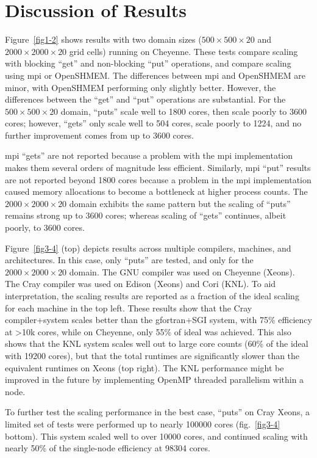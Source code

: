 \section{Discussion of Results}
Figure~\ref{fig1-2} shows results with two domain sizes ($500 \times 500 \times 20$ and $2000 \times 2000 \times 20$ grid cells) running on Cheyenne.
These tests compare scaling with blocking ``get'' and non-blocking ``put'' operations, and compare scaling using \gls{mpi} or OpenSHMEM.
The differences between \gls{mpi} and OpenSHMEM are minor, with OpenSHMEM performing only slightly better.
However, the differences between the ``get'' and ``put'' operations are substantial.
For the $500 \times 500 \times 20$ domain, ``puts'' scale well to 1800 cores, then scale poorly to \num{3600} cores;
however, ``gets'' only scale well to \num{504} cores, scale poorly to \num{1224}, and no further improvement comes from up to \num{3600} cores.

\gls{mpi} ``gets'' are not reported because a problem with the \gls{mpi} implementation makes them several orders of magnitude less efficient.
Similarly, \gls{mpi} ``put'' results are not reported beyond \num{1800} cores because a problem in the \gls{mpi} implementation caused memory
allocations to become a bottleneck at higher process counts.
The $2000 \times 2000 \times 20$ domain exhibits the same pattern but the scaling of ``puts'' remains strong up to 3600 cores; whereas
scaling of ``gets'' continues, albeit poorly, to \num{3600} cores.

Figure~\ref{fig3-4} (top) depicts results across multiple compilers, machines, and architectures.
In this case, only ``puts'' are tested, and only for the $2000 \times 2000\times 20$ domain.
The GNU compiler was used on Cheyenne (Xeons). The Cray compiler was used on Edison (Xeons) and Cori (KNL).
To aid interpretation, the scaling results are reported as a fraction of the ideal scaling for each machine in the top left.
These results show that the Cray compiler+system scales better than the gfortran+SGI system,
with 75\% efficiency at >10k cores, while on Cheyenne, only 55\% of ideal was achieved.
This also shows that the KNL system scales well out to large core counts (60\% of the ideal with \num{19200} cores),
but that the total runtimes are significantly slower than the equivalent runtimes on Xeons (top right).
The KNL performance might be improved in the future by implementing OpenMP threaded parallelism within a node.

To further test the scaling performance in the best case, ``puts'' on Cray Xeons, a limited set of tests were performed up to nearly \num{100000} cores (fig.~\ref{fig3-4} bottom).
This system scaled well to over \num{10000} cores, and continued scaling with nearly 50\% of the single-node efficiency at \num{98304} cores.

